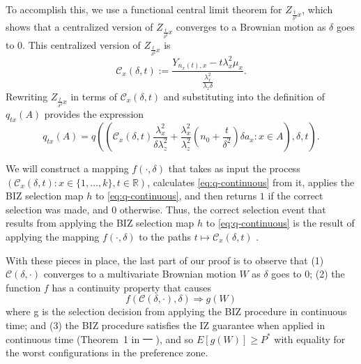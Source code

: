 \documentclass{wscpaperproc}
\theoremstyle{wsc}
\providecommand{\DIFaddtex}[1]{{\protect\color{blue}\uwave{#1}}} %
\providecommand{\DIFdeltex}[1]{{\protect\color{red}\sout{#1}}}                      %
\providecommand{\DIFaddbegin}{} %
\providecommand{\DIFaddend}{} %
\providecommand{\DIFdelbegin}{} %
\providecommand{\DIFdelend}{} %
\providecommand{\DIFadd}[1]{\texorpdfstring{\DIFaddtex{#1}}{#1}} %
\providecommand{\DIFdel}[1]{\texorpdfstring{\DIFdeltex{#1}}{}} %
\begin{document}
To accomplish this, we use a functional central limit theorem for
$Z_{\frac{t}{\delta^{2}}x}$, which shows that a centralized
version of $Z_{\frac{t}{\delta^{2}}x}$ converges to a Brownian motion as $\delta$ goes to $0$.
This centralized version of $Z_{\frac{t}{\delta^{2}}x}$ is 
\[
\mathcal{C}_{x}\left(\delta,t\right):=\frac{Y_{n_{x}\left(t\right),x}-t\lambda_{x}^{2}\mu_{x}}{\frac{\lambda_{x}^{2}}{\lambda_{z}\delta}}.
\]
Rewriting $Z_{\frac{t}{\delta^{2}}x}$ in terms of $\mathcal{C}_{x}\left(\delta,t\right)$ and substituting into the definition of $q_{tx}(A)$ provides the expression
\begin{equation}
    q_{tx}\left(A\right)=q\left(\left(\mathcal{C}_{x}\left(\delta,t\right)\frac{\lambda_{x}^{2}}{\delta\lambda_{z}^{2}}+\frac{\lambda_{x}^{2}}{\lambda_{z}^{2}}\left(n_{0}+\frac{t}{\delta^{2}}\right)\delta a_{x}:x\in A\right),\delta,t \right).
    \label{eq:q}
\end{equation}

We will construct a mapping $f\left(\cdot,\delta\right)$ that takes as input the process
$\left(\mathcal{C}_{x}\left(\delta,t\right) : x\in \{1,\ldots,k\}, t\in\mathbb{R}\right)$,
calculates 
\eqref{eq:q-continuous}
from it,
applies the BIZ selection map $h$ to \eqref{eq:q-continuous}, 
and then returns $1$ if the correct selection was made,
and $0$ otherwise.
Thus, the correct selection event that results from applying
the BIZ selection map $h$ to \eqref{eq:q-continuous} is the result
of applying the mapping $f\left(\cdot,\delta\right)$
to the paths $t\mapsto\mathcal{C}_{x}\left(\delta,t\right)$ .



With these pieces in place, the last part of our proof is to observe that (1) $\mathcal{C}\left(\delta,\cdot\right)$
converges to a multivariate Brownian motion $W$ as $\delta$ goes
to 0; (2) the function $f$ has a continuity property that causes
\[
f\left(\mathcal{C}\left(\delta,\cdot\right),\delta\right)\Rightarrow g\left(W\right)
\]
where g is the selection decision from applying the BIZ procedure
in continuous time; and (3) the BIZ procedure satisfies the IZ guarantee
when applied in continuous time (Theorem~1 in \DIFdelbegin \DIFdel{\mbox{%
\cite{Frazier:BIZ}
}%
}\DIFdelend \DIFaddbegin \DIFadd{\mbox{%
}%
}\DIFaddend ), and so $E[g(W)] \ge P^*$ with equality for the worst configurations in the preference zone.
\end{document}
